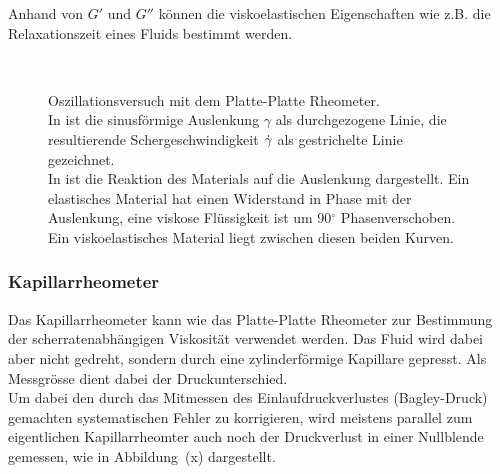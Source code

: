 Anhand von $G'$ und $G''$ können die viskoelastischen Eigenschaften wie z.B. die Relaxationszeit eines Fluids bestimmt werden.

\begin{figure}
    \centering
    \\
    \caption{Oszillationsversuch mit dem Platte-Platte Rheometer.\\
    In  ist die sinusförmige Auslenkung $\gamma$ als durchgezogene Linie, die resultierende Schergeschwindigkeit $\dot\gamma$ als gestrichelte Linie gezeichnet.\\
    In  ist die Reaktion des Materials auf die Auslenkung dargestellt. Ein elastisches Material hat einen Widerstand in Phase mit der Auslenkung, eine viskose Flüssigkeit ist um 90$^\circ$ Phasenverschoben. Ein viskoelastisches Material liegt zwischen diesen beiden Kurven.
    }
    \label{fig:schwingungsmodi}
\end{figure}
%
\subsubsection{Kapillarrheometer}
Das Kapillarrheometer kann wie das Platte-Platte Rheometer zur Bestimmung der scherratenabhängigen Viskosität verwendet werden. Das Fluid wird dabei aber nicht gedreht, sondern durch eine zylinderförmige Kapillare gepresst. Als Messgrösse dient dabei der Druckunterschied.\\
Um dabei den durch das Mitmessen des Einlaufdruckverlustes (Bagley-Druck) gemachten systematischen Fehler zu korrigieren, wird meistens parallel zum eigentlichen Kapillarrheomter auch noch der Druckverlust in einer Nullblende gemessen, wie in Abbildung~(x) dargestellt. 

